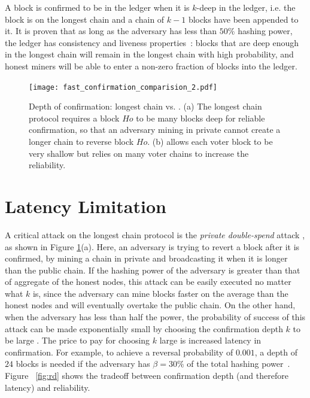  A block is confirmed to be in the ledger when it is $k$-deep in the ledger, i.e. the block is on the longest chain and a chain of $k-1$ blocks have been appended to it. It is proven that as long as the adversary has less than $50\%$ hashing power, the ledger has consistency and liveness properties~\cite{backbone}: blocks that are deep enough in the longest chain will remain in the longest chain with high probability, and honest miners will be able to enter a non-zero fraction of blocks into the ledger. 

\begin{figure}
\begin{center}
\texttt{[image: fast\_confirmation\_comparision\_2.pdf]}
\end{center}
\caption{\small Depth of confirmation: longest chain vs. \prism. (a) The longest chain protocol requires a block $Ho$ to be many blocks deep for reliable confirmation, so that an adversary mining in private cannot create a longer chain to reverse block $Ho$. (b) \prism allows each voter block to be very shallow but relies on many voter chains to increase the reliability.}
\label{fig:double_spend}
\end{figure}

\section{Latency Limitation}
\label{s:lc-latency}
A critical attack on the longest chain protocol is the {\em private  double-spend} attack \cite{bitcoin}, as shown in Figure \ref{fig:double_spend}(a). Here, an adversary is trying to revert a block after it is confirmed, by mining a chain in private and broadcasting it when it is longer than the public chain. If the hashing power of the adversary is greater than that of aggregate of the honest nodes, this attack can be easily executed no matter what $k$ is, since the adversary can mine blocks faster on the average than the honest nodes and will eventually  overtake the public chain. On the other hand, when the adversary has less than half the power, the probability of success of this attack can be made exponentially small by choosing the confirmation depth $k$ to be large \cite{bitcoin}. The price to pay for choosing $k$ large is increased latency in confirmation. For example, to achieve a reversal probability of  $0.001$, a depth of $24$ blocks is needed if the adversary has $\beta = 30\%$ of the total hashing power~\cite{bitcoin}.  Figure ~\ref{fig:rd} shows the tradeoff between confirmation depth (and therefore latency) and reliability.



